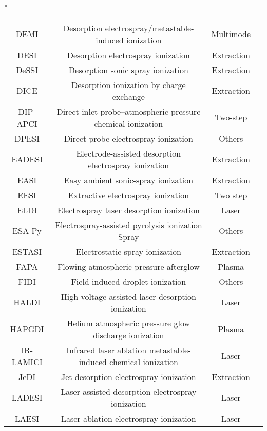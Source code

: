 \begin{table}{*}
\begin{tabular}{|c|c|c|l|}
        DEMI & Desorption electrospray/metastable-induced ionization & Multimode & \cite{19689156} \\
        DESI & Desorption electrospray ionization & Extraction & \cite{15486296} \\
        DeSSI & Desorption sonic spray ionization & Extraction & \cite{16941547} \\
        DICE & Desorption ionization by charge exchange & Extraction & \cite{20542709} \\
        DIP-APCI & Direct inlet probe–atmospheric-pressure chemical ionization & Two-step & \cite{23912829} \\
        DPESI & Direct probe electrospray ionization & Others & \cite{16351172} \\
        EADESI & Electrode-assisted desorption electrospray ionization & Extraction & \cite{20857387} \\
        EASI & Easy ambient sonic-spray ionization & Extraction & \cite{18179250} \\ 
        EESI & Extractive electrospray ionization & Two step & \cite{16767269} \\
        ELDI & Electrospray laser desorption ionization & Laser & \cite{17479981} \\
        ESA-Py & Electrospray-assisted pyrolysis ionization Spray & Others & \cite{16316184}\\
        ESTASI & Electrostatic spray ionization & Extraction & \cite{24446793} \\
        FAPA & Flowing atmospheric pressure afterglow & Plasma & \cite{Andrade_2008} \\
        FIDI & Field-induced droplet ionization & Others & \cite{Grimm_2003} \\
        HALDI & High-voltage-assisted laser desorption ionization & Laser & \cite{23413220} \\
        HAPGDI & Helium atmospheric pressure glow discharge ionization & Plasma & \cite{Andrade_2008} \\
        IR-LAMICI & Infrared laser ablation metastable-induced chemical ionization & Laser & \cite{20155978} \\
        JeDI & Jet desorption electrospray ionization & Extraction & \cite{18671242} \\
        LADESI & Laser assisted desorption electrospray ionization & Laser & \cite{18227946} \\
        LAESI & Laser ablation electrospray ionization & Laser & \cite{20680590} \\

\end{tabular}
\end{table}
